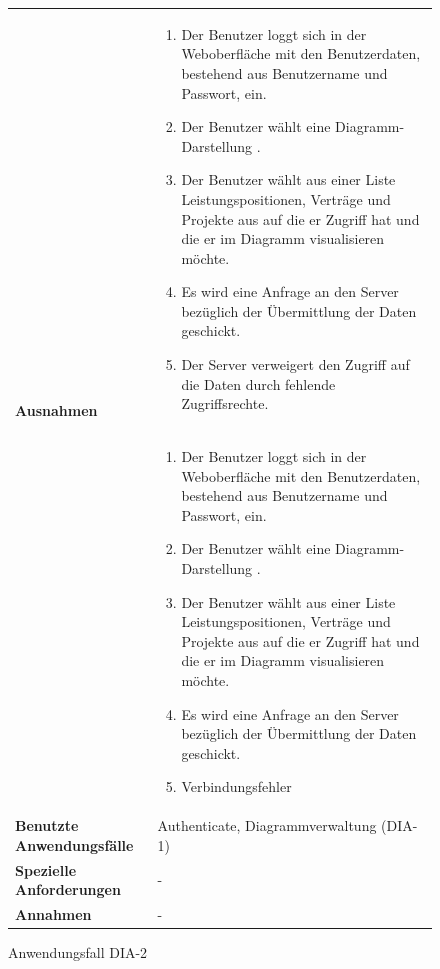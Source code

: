 \begin{figure}[h]
	\centering
	\begin{tabularx}{\textwidth}{ X | X }
		\multirow{2}{*}{\textbf{Ausnahmen}} &
		\begin{enumerate} %
			\item Der Benutzer loggt sich in der Weboberfläche mit den Benutzerdaten, bestehend aus Benutzername und Passwort, ein.
			\item Der Benutzer wählt eine Diagramm-Darstellung .
			\item Der Benutzer wählt aus einer Liste Leistungspositionen, Verträge und Projekte aus auf die er Zugriff hat und die er im Diagramm visualisieren möchte.
			\item Es wird eine Anfrage an den Server bezüglich der Übermittlung der Daten geschickt.
			\item Der Server verweigert den Zugriff auf die Daten durch fehlende Zugriffsrechte.
		\end{enumerate} \\\cline{2-2} &
		\begin{enumerate} %
			\item Der Benutzer loggt sich in der Weboberfläche mit den Benutzerdaten, bestehend aus Benutzername und Passwort, ein.
			\item Der Benutzer wählt eine Diagramm-Darstellung .
			\item Der Benutzer wählt aus einer Liste Leistungspositionen, Verträge und Projekte aus auf die er Zugriff hat und die er im Diagramm visualisieren möchte.
			\item Es wird eine Anfrage an den Server bezüglich der Übermittlung der Daten geschickt.
			\item Verbindungsfehler
		\end{enumerate}  \\ \hline
		\textbf{Benutzte Anwendungsfälle} & Authenticate, Diagrammverwaltung (DIA-1)\\ \hline
		\textbf{Spezielle Anforderungen} & - \\ \hline
		\textbf{Annahmen} & -
	\end{tabularx}
	\caption{Anwendungsfall DIA-2}
	\label{fig:anwendungsfall-DIA-2}

	
\end{figure}
